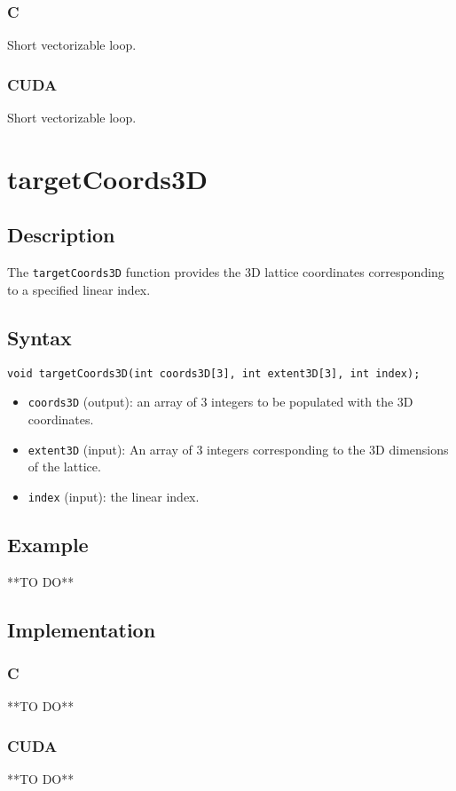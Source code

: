 \subsubsection{C}
Short vectorizable loop.
\subsubsection{CUDA}
Short vectorizable loop.

\newpage
\section{targetCoords3D}

\subsection{Description}

The \verb+targetCoords3D+ function provides the 3D lattice coordinates corresponding to a specified linear index.

\subsection{Syntax}
\begin{verbatim}
void targetCoords3D(int coords3D[3], int extent3D[3], int index);
\end{verbatim}

\begin{itemize}
\item \verb+coords3D+ (output): an array of 3 integers to be populated with the 3D coordinates.
\item \verb+extent3D+ (input): An array of 3 integers corresponding to the 3D dimensions of the lattice.
\item \verb+index+ (input): the linear index. 

\end{itemize}


\subsection{Example}
**TO DO**
\subsection{Implementation}
\subsubsection{C}
**TO DO**
\subsubsection{CUDA}
**TO DO**

